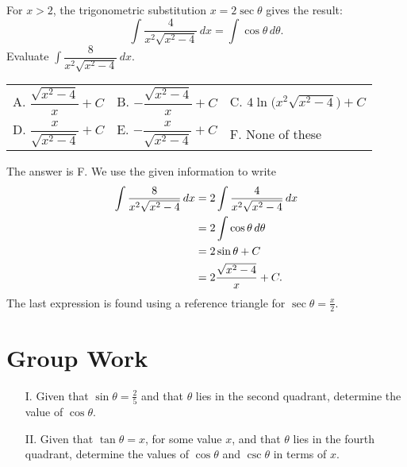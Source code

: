 \documentclass[]{ximera}
\begin{document}
\begin{problem}
For $x>2$, the trigonometric substitution $x = 2 \sec \theta$ gives the result: $$\int \dfrac{4}{x^2\sqrt{x^2-4}} \, dx = \int  \cos \theta \, d \theta.$$
Evaluate $\displaystyle \int \dfrac{8}{x^2\sqrt{x^2-4}} \, dx$.

\vspace{2mm}
\begin{tabular}{lll}
A.  $\dfrac{\sqrt{x^2-4}}{x}+C$    \hspace{10mm} & B. $-\dfrac{\sqrt{x^2-4}}{x}+C$   \hspace{12mm} & C.  $4 \ln\bigg(x^2\sqrt{x^2-4}\bigg) +C$  \\[3ex]
D. $\dfrac{x}{\sqrt{x^2-4}}+C$   \hspace{15mm} & E.  $-\dfrac{x}{\sqrt{x^2-4}}+C$ \hspace{10mm} & F. None of these\\  [2 ex] 
\end{tabular}
\end{problem}

\begin{freeResponse}
The answer is F. We use the given information to write
\begin{align*}
\displaystyle \int \dfrac{8}{x^2\sqrt{x^2-4}} \mathop{}\!d x &= 2 \int \dfrac{4}{x^2\sqrt{x^2-4}} \mathop{}\!d x \\
&= 2 \int \cos \theta \mathop{}\!d \theta \\
&= 2 \sin \theta + C \\
&= 2 \frac{\sqrt{x^2-4}}{x} + C.
\end{align*}
The last expression is found using a reference triangle for $\sec \theta = \frac{x}{2}$. 
\end{freeResponse}



\section{Group Work}

\begin{problem}
\begin{enumerate}
\item[I.] Given that $\sin \theta = \frac{2}{5}$ and that $\theta$ lies in the second quadrant, determine the value of $\cos \theta$.
\item[II.] Given that $\tan \theta = x$, for some value $x$, and that $\theta$ lies in the fourth quadrant, determine the values of $\cos \theta$ and $\csc \theta$ in terms of $x$.
\end{enumerate}
\end{problem}
\end{document}
